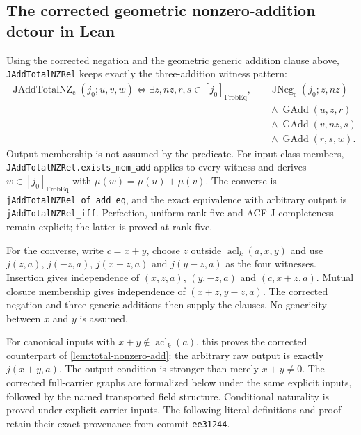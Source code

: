 \documentclass[11pt,oneside]{article}
\theoremstyle{definition}
\theoremstyle{remark}
\newcommand{\acl}{\operatorname{acl}}
\newcommand{\lean}[1]{\nolinkurl{#1}}
\begin{document}
\subsection{The corrected geometric nonzero-addition detour in Lean}

Using the corrected negation and the geometric generic addition clause above,
\lean{JAddTotalNZRel} keeps exactly the three-addition witness pattern:
\[
\begin{split}
\operatorname{JAddTotalNZ}_{\mathrm c}(j_0;u,v,w)
\Longleftrightarrow \exists z,nz,r,s\in[j_0]_{\operatorname{FrobEq}},\quad&
 \operatorname{JNeg}_{\mathrm c}(j_0;z,nz)\\
&{}\land\operatorname{GAdd}(u,z,r)\\
&{}\land\operatorname{GAdd}(v,nz,s)\\
&{}\land\operatorname{GAdd}(r,s,w).
\end{split}
\]
Output membership is not assumed by the predicate. For input class members,
\lean{JAddTotalNZRel.exists_mem_add} applies to every witness and derives
$w\in[j_0]_{\operatorname{FrobEq}}$ with $\mu(w)=\mu(u)+\mu(v)$.
The converse is \lean{jAddTotalNZRel_of_add_eq}, and the exact equivalence
with arbitrary output is \lean{jAddTotalNZRel_iff}. Perfection, uniform rank five
and ACF J completeness remain explicit; the latter is proved at rank five.

For the converse, write $c=x+y$, choose $z$ outside $\acl_k(a,x,y)$ and use
$j(z,a)$, $j(-z,a)$, $j(x+z,a)$ and $j(y-z,a)$ as the four witnesses.
Insertion gives independence of $(x,z,a)$, $(y,-z,a)$ and $(c,x+z,a)$.
Mutual closure membership gives independence of $(x+z,y-z,a)$.
The corrected negation and three generic additions then supply the clauses.
No genericity between $x$ and $y$ is assumed.

For canonical inputs with $x+y\notin\acl_k(a)$, this proves the corrected
counterpart of \cref{lem:total-nonzero-add}: the arbitrary raw output is
exactly $j(x+y,a)$. The output condition is stronger than merely $x+y\ne0$.
The corrected full-carrier graphs are formalized below under the same explicit
inputs, followed by the named transported field structure. Conditional naturality is proved
under explicit carrier inputs.
The following literal definitions and proof retain their exact provenance from commit
\texttt{ee31244}.
\end{document}
